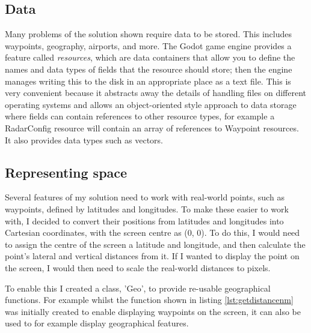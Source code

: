 \documentclass{article}
\begin{document}
\subsection{Data}
Many problems of the solution shown require data to be stored.
This includes waypoints, geography, airports, and more.
The Godot game engine provides a feature called \textit{resources}, which are data containers that allow you to define the names and data types of fields that the resource should store; then the engine manages writing this to the disk in an appropriate place as a text file.
This is very convenient because it abstracts away the details of handling files on different operating systems and allows an object-oriented style approach to data storage where fields can contain references to other resource types, for example a RadarConfig resource will contain an array of references to Waypoint resources.
It also provides data types such as vectors.


\subsection{Representing space}
Several features of my solution need to work with real-world points, such as \glspl{waypoint}, defined by latitudes and longitudes.
To make these easier to work with, I decided to convert their positions from latitudes and longitudes into Cartesian coordinates, with the screen centre as (0, 0).
To do this, I would need to assign the centre of the screen a latitude and longitude, and then calculate the point's lateral and vertical distances from it.
If I wanted to display the point on the screen, I would then need to scale the real-world distances to pixels.

To enable this I created a class, 'Geo', to provide re-usable geographical functions.
For example whilst the function shown in listing \ref{lst:getdistancenm} was initially created to enable displaying waypoints on the screen, it can also be used to for example display geographical features.
\end{document}
